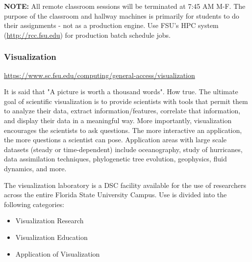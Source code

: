 \documentclass[12pt,a4paper]{article}
\begin{document}
\textbf{NOTE:} All remote classroom sessions will be terminated at 7:45 AM M-F. The purpose of the classroom and hallway machines is primarily for students to do their assignments - not as a production engine. Use FSU's HPC system (\url{http://rcc.fsu.edu}) for production batch schedule jobs.

\subsubsection{Visualization}
\url{https://www.sc.fsu.edu/computing/general-access/visualization}

It is said that "A picture is worth a thousand words". How true. The ultimate goal of scientific visualization is to provide scientists with tools that permit them to analyze their data, extract information/features, correlate that information, and display their data in a meaningful way. More importantly, visualization encourages the scientists to ask questions. The more interactive an application, the more questions a scientist can pose. Application areas with large scale datasets (steady or time-dependent) include oceanography, study of hurricanes, data assimilation techniques, phylogenetic tree evolution, geophysics, fluid dynamics, and more.

The visualization laboratory is a DSC facility available for the use of researchers across the entire Florida State University Campus. Use is divided into the following categories:
\begin{itemize}
    \item Visualization Research
    \item Visualization Education
    \item Application of Visualization
\end{itemize}
\end{document}
